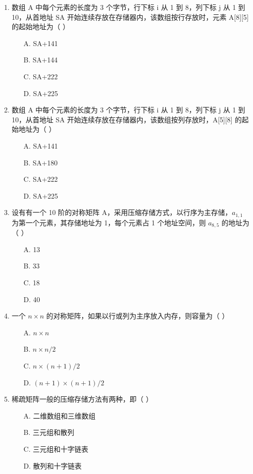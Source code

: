\documentclass[12pt, a4paper]{article}
\begin{document}
\begin{enumerate}[label=\arabic*.]
	\item 数组 A 中每个元素的长度为 3 个字节，行下标 i 从 1 到 8，列下标 j 从 1 到 10，从首地址 SA 开始连续存放在存储器内，该数组按行存放时，元素 A[8][5] 的起始地址为（ ）
	      \begin{enumerate}
		      \item[A.] SA+141
		      \item[B.] SA+144
		      \item[C.] SA+222
		      \item[D.] SA+225
	      \end{enumerate}

	\item 数组 A 中每个元素的长度为 3 个字节，行下标 i 从 1 到 8，列下标 j 从 1 到 10，从首地址 SA 开始连续存放在存储器内，该数组按列存放时，A[5][8] 的起始地址为（ ）
	      \begin{enumerate}
		      \item[A.] SA+141
		      \item[B.] SA+180
		      \item[C.] SA+222
		      \item[D.] SA+225
	      \end{enumerate}

	\item 设有有一个 10 阶的对称矩阵 A，采用压缩存储方式，以行序为主存储，$a_{1,1}$ 为第一个元素，其存储地址为 1，每个元素占 1 个地址空间，则 $a_{8,5}$ 的地址为（ ）
	      \begin{enumerate}
		      \item[A.] 13
		      \item[B.] 33
		      \item[C.] 18
		      \item[D.] 40
	      \end{enumerate}

	\item 一个 $n \times n$ 的对称矩阵，如果以行或列为主序放入内存，则容量为（ ）
	      \begin{enumerate}
		      \item[A.] $n \times n$
		      \item[B.] $n \times n / 2$
		      \item[C.] $n \times (n+1) / 2$
		      \item[D.] $(n+1) \times (n+1) / 2$
	      \end{enumerate}

	\item 稀疏矩阵一般的压缩存储方法有两种，即（ ）
	      \begin{enumerate}
		      \item[A.] 二维数组和三维数组
		      \item[B.] 三元组和散列
		      \item[C.] 三元组和十字链表
		      \item[D.] 散列和十字链表
	      \end{enumerate}


\end{enumerate}
\end{document}
